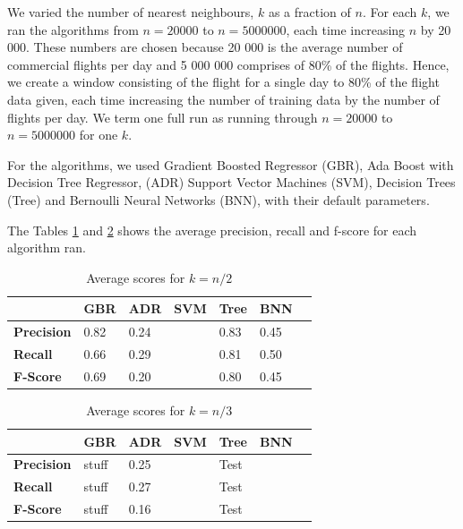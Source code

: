 \documentclass[letterpaper,11pt]{article}
\begin{document}
We varied the number of nearest neighbours, $k$ as a fraction of $n$. For each $k$, we ran the algorithms from $n = 20 000$ to $n = 5 000 000$, each time increasing $n$ by 20 000. These numbers are chosen because 20 000 is the average number of commercial flights per day and 5 000 000 comprises of 80\% of the flights. Hence, we create a window consisting of the flight for a single day to 80\% of the flight data given, each time increasing the number of training data by the number of flights per day. We term one full run as running through $n = 20 000$ to $n = 5 000 000$ for one $k$. 

For the algorithms, we used Gradient Boosted Regressor (GBR), Ada Boost with Decision Tree Regressor, (ADR) Support Vector Machines (SVM), Decision Trees (Tree) and Bernoulli Neural Networks (BNN), with their default parameters. 


The Tables \ref{table:k/2} and \ref{table:k/3} shows the average precision, recall and f-score for each algorithm ran. 

\begin{centering}
\begin{table}
\begin{tabular}{ | l | l | l | l | l | l | l |}
  \hline
   & \textbf{GBR}& \textbf{ADR} & \textbf{SVM} & \textbf{Tree} & \textbf{BNN}\\ \hline
  \textbf{Precision} & 0.82 & 0.24 & & 0.83 & 0.45\\  \hline
  \textbf{Recall} & 0.66 & 0.29 & & 0.81 & 0.50\\  \hline
  \textbf{F-Score} & 0.69 & 0.20 & & 0.80 & 0.45\\  
  \hline
\end{tabular}
\label{table:k/2}
\caption{Average scores for $k=n/2$}
\end{table}
\end{centering}

\begin{centering}
\begin{table}
\begin{tabular}{ | l | l | l | l | l | l | l |}
  \hline
   & \textbf{GBR}& \textbf{ADR} & \textbf{SVM} & \textbf{Tree} & \textbf{BNN}\\ \hline
  \textbf{Precision} & stuff & 0.25 & & Test & \\  \hline
  \textbf{Recall} & stuff & 0.27 & & Test & \\  \hline
  \textbf{F-Score} & stuff & 0.16 & & Test & \\  
  \hline
\end{tabular}
\label{table:k/3}
\caption{Average scores for $k=n/3$}  
\end{table}
\end{centering}
\end{document}
